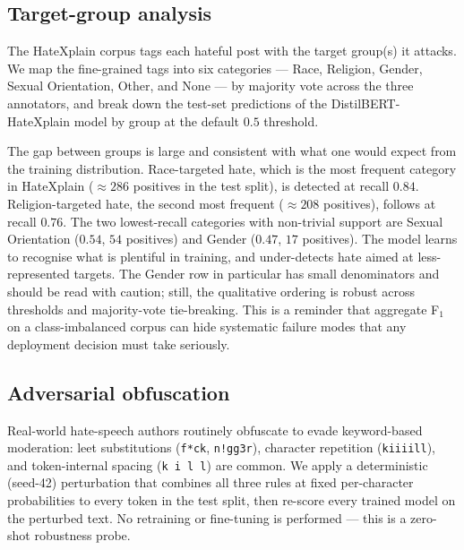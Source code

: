 \documentclass[11pt]{article}
\begin{document}
\subsection{Target-group analysis}
\label{sec:targets}

The HateXplain corpus tags each hateful post with the target group(s) it
attacks. We map the fine-grained tags into six categories --- Race,
Religion, Gender, Sexual Orientation, Other, and None --- by majority vote
across the three annotators, and break down the test-set predictions of
the DistilBERT-HateXplain model by group at the default $0.5$ threshold.



The gap between groups is large and consistent with what one would expect
from the training distribution. Race-targeted hate, which is the most
frequent category in HateXplain ($\approx 286$ positives in the test
split), is detected at recall $0.84$. Religion-targeted hate, the second
most frequent ($\approx 208$ positives), follows at recall $0.76$. The
two lowest-recall categories with non-trivial support are
Sexual Orientation ($0.54$, $54$ positives) and Gender ($0.47$, $17$
positives). The model learns to recognise what is plentiful in training,
and under-detects hate aimed at less-represented targets. The Gender row
in particular has small denominators and should be read with caution;
still, the qualitative ordering is robust across thresholds and
majority-vote tie-breaking. This is a reminder that aggregate F$_1$ on a
class-imbalanced corpus can hide systematic failure modes that any
deployment decision must take seriously.

\subsection{Adversarial obfuscation}
\label{sec:adversarial}

Real-world hate-speech authors routinely obfuscate to evade keyword-based
moderation: leet substitutions (\texttt{f*ck}, \texttt{n!gg3r}),
character repetition (\texttt{kiiiill}), and token-internal spacing
(\texttt{k i l l}) are common. We apply a deterministic (seed-42)
perturbation that combines all three rules at fixed per-character
probabilities to every token in the test split, then re-score every
trained model on the perturbed text. No retraining or fine-tuning is
performed --- this is a zero-shot robustness probe.


\end{document}
